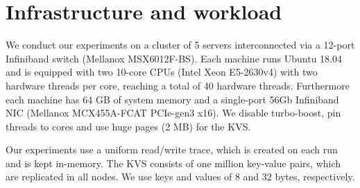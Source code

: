 \section{Infrastructure and workload}
\label{sec:meth}


We conduct our experiments on a cluster of 5 servers interconnected via a 12-port Infiniband switch (Mellanox MSX6012F-BS). Each machine runs Ubuntu 18.04 and is equipped with two 10-core CPUs (Intel Xeon E5-2630v4) with two hardware threads per core, reaching a total of 40 hardware threads. 
Furthermore each machine has 64 GB of system memory and a single-port 56Gb Infiniband NIC (Mellanox MCX455A-FCAT PCIe-gen3 x16). %
We disable turbo-boost, pin threads to cores and use huge pages (2 MB) for the KVS. 

Our experiments use a uniform read/write trace, which is created on each run and is kept in-memory.
The KVS consists of one million key-value pairs, which are replicated in all nodes. We use keys and values of $8$ and $32$ bytes, respectively. 


\begin{comment}
The availability penalty need not be as big in this case, because the cost of a false positive is not as big: on a timeout, the leader is not removed from the configuration, but rather only voted out. 
\end{comment}